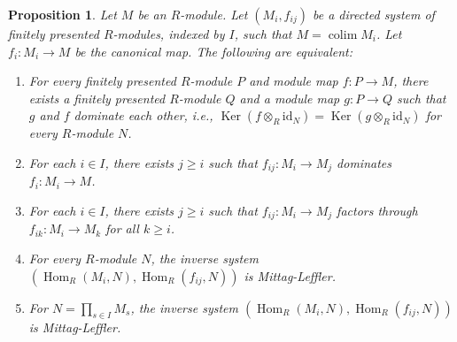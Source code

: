 \documentclass{amsart}
\theoremstyle{plain}
\newtheorem{proposition}[subsection]{Proposition}
\theoremstyle{definition}
\theoremstyle{remark}
\numberwithin{equation}{subsection}
\def\colim{\mathop{\mathrm{colim}}\nolimits}
\def\Hom{\mathop{\mathrm{Hom}}\nolimits}
\def\Ker{\mathop{\mathrm{Ker}}}
\begin{document}
\begin{proposition}
\label{proposition-ML-characterization}
Let $M$ be an $R$-module.  Let $(M_i, f_{ij})$ be a directed system of finitely
presented $R$-modules, indexed by $I$, such that $M = \colim M_i$.  Let
$f_i:
M_i \to M$ be the canonical map.  The following are equivalent:
\begin{enumerate}
\item For every finitely presented $R$-module $P$ and module map $f: P
\to M$, there exists a finitely presented $R$-module $Q$ and a module
map $g: P \to Q$ such that $g$ and $f$ dominate each other, i.e.,
$\Ker(f \otimes_R \text{id}_N) = \Ker(g \otimes_R \text{id}_N)$
for every $R$-module $N$.
\item For each $i \in I$, there exists $j \geq i$ such that $f_{ij}: M_i
\to M_j$ dominates $f_i: M_i \to M$.
\item For each $i \in I$, there exists $j \geq i$ such that $f_{ij}: M_i
\to M_j$ factors through $f_{ik}: M_i \to M_k$ for all $k \geq
i$.
\item For every $R$-module $N$, the inverse system
$(\Hom_R(M_i, N), \Hom_R(f_{ij}, N))$ is Mittag-Leffler.
\item For $N = \prod_{s \in I} M_s$, the inverse system
$(\Hom_R(M_i, N), \Hom_R(f_{ij}, N))$ is Mittag-Leffler.
\end{enumerate}
\end{proposition}
\end{document}
